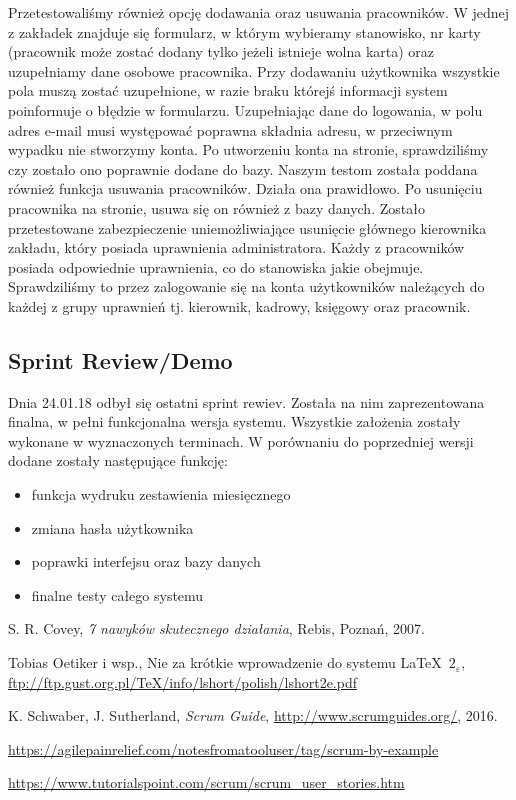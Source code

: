 \documentclass[a4paper]{article}
\begin{document}
Przetestowaliśmy również opcję dodawania oraz usuwania pracowników. W jednej z zakładek znajduje się formularz, w którym wybieramy stanowisko, nr karty (pracownik może zostać dodany tylko jeżeli istnieje wolna karta) oraz uzupełniamy dane osobowe pracownika. Przy dodawaniu użytkownika wszystkie pola muszą zostać uzupełnione, w razie braku którejś informacji system poinformuje o błędzie w formularzu. Uzupełniając dane do logowania, w polu adres e-mail musi występować poprawna składnia adresu, w przeciwnym wypadku nie stworzymy konta. Po utworzeniu konta na stronie, sprawdziliśmy czy zostało ono poprawnie dodane do bazy. Naszym testom została poddana również funkcja usuwania pracowników. Działa ona prawidłowo. Po usunięciu pracownika na stronie, usuwa się on również z bazy danych. Zostało przetestowane zabezpieczenie uniemożliwiające usunięcie głównego kierownika zakładu, który posiada uprawnienia administratora.
Każdy z pracowników posiada odpowiednie uprawnienia, co do stanowiska jakie obejmuje. Sprawdziliśmy to przez zalogowanie się na konta użytkowników należących do każdej z grupy uprawnień tj. kierownik, kadrowy, księgowy oraz pracownik.


\subsection{Sprint Review/Demo}
Dnia 24.01.18 odbył się ostatni sprint rewiev. Została na nim zaprezentowana finalna, w pełni funkcjonalna wersja systemu. Wszystkie założenia zostały wykonane w wyznaczonych terminach. W porównaniu do poprzedniej wersji dodane zostały następujące funkcję:
\begin{itemize}
\item funkcja wydruku zestawienia miesięcznego
\item zmiana hasła użytkownika
\item poprawki interfejsu oraz bazy danych
\item finalne testy całego systemu
\end{itemize}


\begin{thebibliography}{9}

 S. R. Covey, {\em 7 nawyków skutecznego działania}, Rebis, Poznań, 2007.

 Tobias Oetiker i wsp., Nie za krótkie wprowadzenie do systemu \LaTeX  \ $2_\varepsilon$, \url{ftp://ftp.gust.org.pl/TeX/info/lshort/polish/lshort2e.pdf}

 K. Schwaber, J. Sutherland, {\em Scrum Guide}, \url{http://www.scrumguides.org/}, 2016.

 \url{https://agilepainrelief.com/notesfromatooluser/tag/scrum-by-example}

 \url{https://www.tutorialspoint.com/scrum/scrum_user_stories.htm}

\end{thebibliography}
\end{document}
